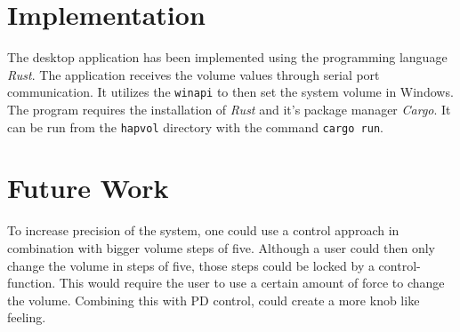   \begin{figure}[H]
    \centering
  \end{figure}

  \section*{Implementation}

  The desktop application has been implemented using the programming language \textit{Rust}. The application receives the volume values through serial port communication. It utilizes the \texttt{winapi} to then set the system volume in Windows. The program requires the installation of \textit{Rust} and it's package manager \textit{Cargo}. It can be run from the \texttt{hapvol} directory with the command \texttt{cargo run}.

  \section*{Future Work}

  To increase precision of the system, one could use a control approach in combination with bigger volume steps of five. Although a user could then only change the volume in steps of five, those steps could be locked by a control-function. This would require the user to use a certain amount of force to change the volume. Combining this with PD control, could create a more knob like feeling.

